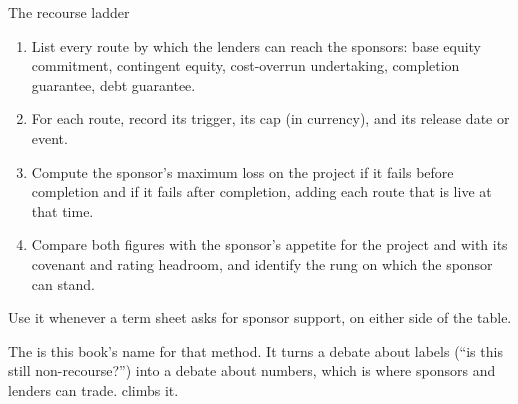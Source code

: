 \begin{framework}[label={fw:recourse-ladder}]{The recourse ladder}
\begin{enumerate}
\item List every route by which the lenders can reach the sponsors: base equity commitment, contingent equity, cost-overrun undertaking, completion guarantee, debt guarantee.
\item For each route, record its trigger, its cap (in currency), and its release date or event.
\item Compute the sponsor's maximum loss on the project if it fails before completion and if it fails after completion, adding each route that is live at that time.
\item Compare both figures with the sponsor's appetite for the project and with its covenant and rating headroom, and identify the rung on which the sponsor can stand.
\end{enumerate}
Use it whenever a term sheet asks for sponsor support, on either side of the table.
\end{framework}

The  is this book's name for that method. It turns a debate about labels (``is this still non-recourse?'') into a debate about numbers, which is where sponsors and lenders can trade.  climbs it.

